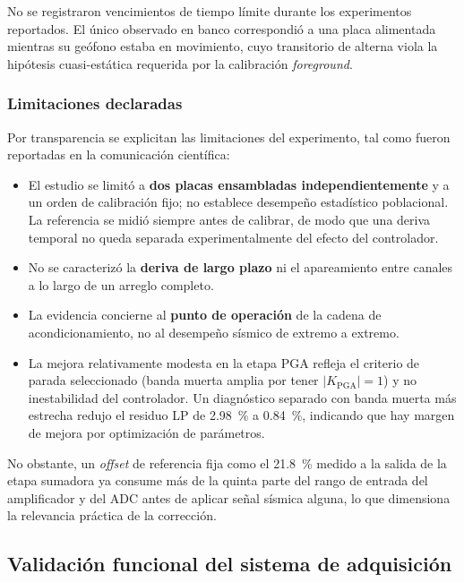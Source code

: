 No se registraron vencimientos de tiempo l\'imite durante los experimentos reportados. El
\'unico observado en banco correspondi\'o a una placa alimentada mientras su ge\'ofono estaba
en movimiento, cuyo transitorio de alterna viola la hip\'otesis cuasi-est\'atica requerida
por la calibraci\'on \emph{foreground}.

\subsubsection{Limitaciones declaradas}

Por transparencia se explicitan las limitaciones del experimento, tal como fueron
reportadas en la comunicaci\'on cient\'ifica:

\begin{itemize}[itemsep=0.15em]
    \item El estudio se limit\'o a \textbf{dos placas ensambladas independientemente} y a
    un orden de calibraci\'on fijo; no establece desempe\~no estad\'istico poblacional. La
    referencia se midi\'o siempre antes de calibrar, de modo que una deriva temporal no
    queda separada experimentalmente del efecto del controlador.
    \item No se caracteriz\'o la \textbf{deriva de largo plazo} ni el apareamiento entre
    canales a lo largo de un arreglo completo.
    \item La evidencia concierne al \textbf{punto de operaci\'on} de la cadena de
    acondicionamiento, no al desempe\~no s\'ismico de extremo a extremo.
    \item La mejora relativamente modesta en la etapa PGA refleja el criterio de parada
    seleccionado (banda muerta amplia por tener $|K_{\mathrm{PGA}}|=1$) y no
    inestabilidad del controlador. Un diagn\'ostico separado con banda muerta m\'as estrecha
    redujo el residuo LP de \SI{2.98}{\percent} a \SI{0.84}{\percent}, indicando que hay
    margen de mejora por optimizaci\'on de par\'ametros.
\end{itemize}

No obstante, un \emph{offset} de referencia fija como el \SI{21.8}{\percent} medido a la
salida de la etapa sumadora ya consume m\'as de la quinta parte del rango de entrada del
amplificador y del ADC antes de aplicar se\~nal s\'ismica alguna, lo que dimensiona la
relevancia pr\'actica de la correcci\'on.

\subsection{Validaci\'on funcional del sistema de adquisici\'on}

